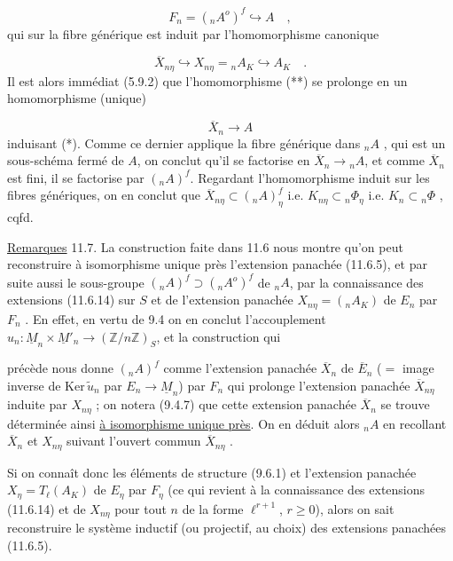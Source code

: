 \begin{equation}\tag{*}
F_n = ({}_nA^o)^f \hookrightarrow A \quad ,
\end{equation}
qui sur la fibre générique est induit par l'homomorphisme canonique

\begin{equation}\tag{**}
\overline{X}_{n\eta} \hookrightarrow X_{n\eta} = {}_nA_K \hookrightarrow A_K \quad .
\end{equation}
Il est alors immédiat (5.9.2) que l'homomorphisme (**) se prolonge en un homomorphisme (unique)

\begin{equation}\tag{***}
\overline{X}_n \longrightarrow A
\end{equation}
induisant (*). Comme ce dernier applique la fibre générique dans ${}_nA$ , qui est un sous-schéma fermé de $A$, on conclut qu'il se factorise en $\overline{X}_n \longrightarrow {}_nA$, et comme $\overline{X}_n$ est fini, il se factorise par $({}_nA)^f$. Regardant l'homomorphisme induit sur les fibres génériques, on en conclut que $\overline{X}_{n\eta} \subset ({}_nA)^f_\eta$ i.e. $K_{n\eta} \subset {}_n\Phi_\eta$ i.e. $K_n \subset {}_n\Phi$ , cqfd.

\underline{Remarques} 11.7. La construction faite dans 11.6 nous montre qu'on peut reconstruire à isomorphisme unique près l'extension panachée (11.6.5), et par suite aussi le sous-groupe $({}_nA)^f \supset ({}_nA^o)^f$ de ${}_nA$, par la connaissance des extensions (11.6.14) sur $S$ et de l'extension panachée $X_{n\eta} = ({}_nA_K)$ de $E_n$ par $F_n$ . En effet, en vertu de 9.4 on en conclut l'accouplement $u_n : \underline{M}_n \times \underline{M}'_n \longrightarrow (\mathbb{Z}/n\mathbb{Z})_S$, et la construction qui



précède nous donne $({}_nA)^f$ comme l'extension panachée $\overline{X}_n$ de $\overline{E}_n$ ($=$ image inverse de $\mathrm{Ker}\,\widetilde{u}_n$ par $E_n \longrightarrow \underline{M}_n$) par $F_n$ qui prolonge l'extension panachée $\overline{X}_{n\eta}$ induite par $X_{n\eta}$ ; on notera (9.4.7) que cette extension panachée $\overline{X}_n$ se trouve déterminée ainsi \underline{à isomorphisme unique près}. On en déduit alors ${}_nA$ en recollant $\overline{X}_n$ et $X_{n\eta}$ suivant l'ouvert commun $\overline{X}_{n\eta}$ .

Si on connaît donc les éléments de structure (9.6.1) et l'extension panachée $X_\eta = T_\ell(A_K)$ de $E_\eta$ par $F_\eta$ (ce qui revient à la connaissance des extensions (11.6.14) et de $X_{n\eta}$ pour tout $n$ de la forme $\ell^{r+1}$, $r \geq 0$), alors on sait reconstruire le système inductif (ou projectif, au choix) des extensions panachées (11.6.5).

